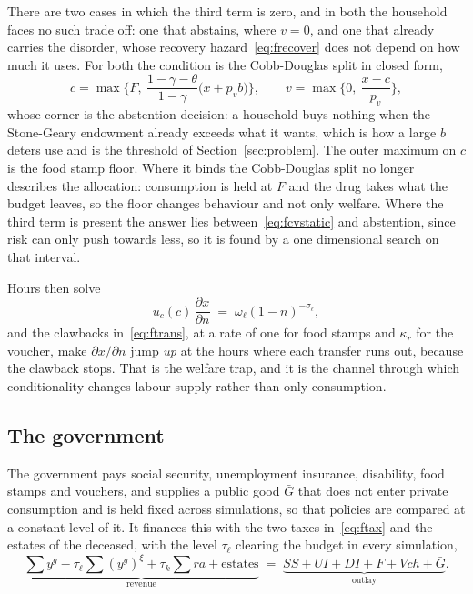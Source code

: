 \documentclass[10pt]{article}
\begin{document}
There are two cases in which the third term is zero, and in both the
household faces no such trade off: one
that abstains, where $v=0$, and one that already carries the disorder, whose
recovery hazard~\eqref{eq:frecover} does not depend on how much it uses. For both
the condition is the Cobb-Douglas split in closed form,
\begin{equation}\label{eq:fcvstatic}
c=\max\Big\{F,\ \frac{1-\gamma-\theta}{1-\gamma}\big(x+p_v b\big)\Big\},
\qquad
v=\max\Big\{0,\ \frac{x-c}{p_v}\Big\},
\end{equation}
whose corner is the abstention decision: a household buys nothing when the
Stone-Geary endowment already exceeds what it wants, which is how a large $b$
deters use and is the threshold of Section~\ref{sec:problem}. The outer
maximum on $c$ is the food stamp floor. Where it binds the Cobb-Douglas split no
longer describes the allocation: consumption is held at $F$ and the drug takes
what the budget leaves, so the floor changes behaviour and not only welfare. Where the third
term is present the answer lies between~\eqref{eq:fcvstatic} and abstention,
since risk can only push towards less, so it is found by a one dimensional search
on that interval.

Hours then solve
\begin{equation}\label{eq:ffoc}
u_c(c)\,\frac{\partial x}{\partial n}\;=\;\omega_{\ell}(1-n)^{-\sigma_{\ell}} ,
\end{equation}
and the clawbacks in~\eqref{eq:ftrans}, at a rate of one for food stamps and
$\kappa_r$ for the voucher, make $\partial x/\partial n$ jump \emph{up} at the
hours where each transfer runs out, because the clawback stops. That is the
welfare trap, and it is the channel through which conditionality changes labour
supply rather than only consumption.

\subsection{The government}

The government pays social security, unemployment insurance,
disability, food stamps and
vouchers, and supplies a public good $\bar G$ that does
not enter private consumption and is held fixed across simulations, so that
policies are compared at a constant level of it. It finances this with the two
taxes in~\eqref{eq:ftax} and
the estates of the deceased, with the level $\tau_{\ell}$ clearing the
budget in every simulation,
\begin{equation}\label{eq:fgovt}
\underbrace{\textstyle\sum y^{g}-\tau_{\ell}\sum (y^{g})^{\xi}
+\tau_k\sum ra+\text{estates}}_{\text{revenue}}
\;=\;
\underbrace{SS+UI+DI+F+V\!ch+\bar G}_{\text{outlay}} .
\end{equation}
\end{document}
